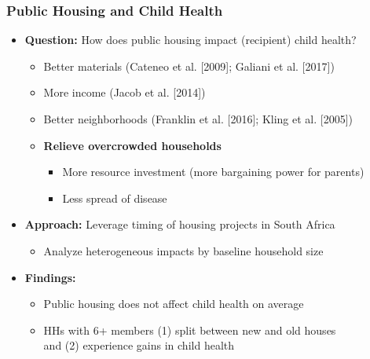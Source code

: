 \documentclass[aspectratio=149]{beamer}
\begin{document}
\begin{frame}
\frametitle{Public Housing and Child Health}

\begin{itemize}
\item \textbf{Question:} How does public housing impact (recipient) child health?
\vspace{.1cm}
  \begin{itemize}
  \item Better materials (Cateneo et al. [2009]; Galiani et al. [2017])
  \vspace{.05cm}
  \item More income (Jacob et al. [2014])
  \vspace{.05cm}
  \item Better neighborhoods (Franklin et al. [2016]; Kling et al. [2005])
  \vspace{.1cm}
  \item \textbf{Relieve overcrowded households}
    \begin{itemize}
      \item More resource investment (more bargaining power for parents)
      \item Less spread of disease
    \end{itemize}
  \end{itemize}

\vspace{.1cm}
\item \textbf{Approach:} Leverage timing of housing projects in South Africa
  \begin{itemize}
    \item Analyze heterogeneous impacts by baseline household size
  \end{itemize}
\vspace{.1cm}

\item \textbf{Findings:}
  \begin{itemize}
    \item Public housing does not affect child health on average
    \item HHs with 6+ members (1) split between new and old houses \\ and (2) experience gains in child health
  \end{itemize}
\end{itemize}

\end{frame}

\end{document}
